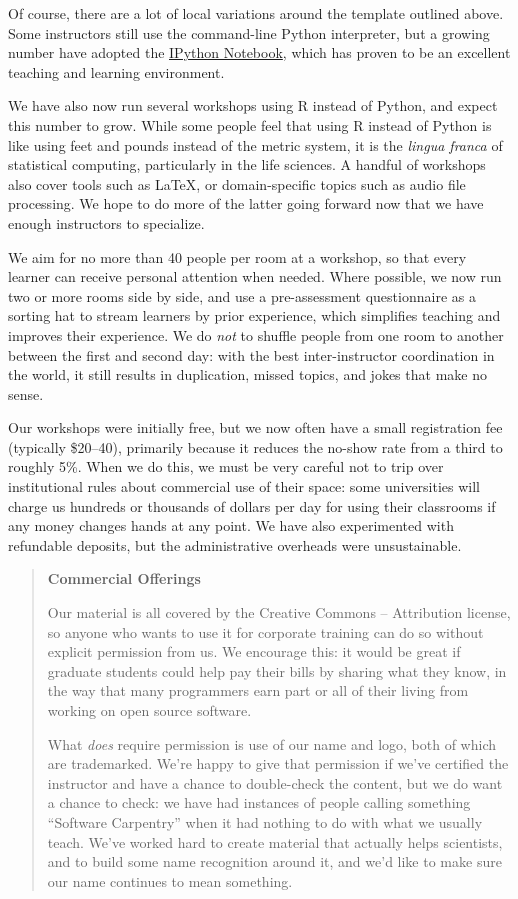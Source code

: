 \documentclass[10pt,a4paper,twocolumn]{article}
\begin{document}
Of course, there are a lot of local variations around the template
outlined above. Some instructors still use the command-line Python
interpreter, but a growing number have adopted the
\href{http://ipython.org/notebook.html}{IPython Notebook}, which has
proven to be an excellent teaching and learning environment.

We have also now run several workshops using R instead of Python, and
expect this number to grow. While some people feel that using R instead
of Python is like using feet and pounds instead of the metric system, it
is the \emph{lingua franca} of statistical computing, particularly in
the life sciences. A handful of workshops also cover tools such as
LaTeX, or domain-specific topics such as audio file processing. We hope
to do more of the latter going forward now that we have enough
instructors to specialize.

We aim for no more than 40 people per room at a workshop, so that
every learner can receive personal attention when needed.  Where
possible, we now run two or more rooms side by side, and use a
pre-assessment questionnaire as a sorting hat to stream learners by
prior experience, which simplifies teaching and improves their
experience.  We do \emph{not} to shuffle people from one room to
another between the first and second day: with the best
inter-instructor coordination in the world, it still results in
duplication, missed topics, and jokes that make no sense.

Our workshops were initially free, but we now often have a small
registration fee (typically \$20--40), primarily because it reduces
the no-show rate from a third to roughly 5\%.  When we do this, we
must be very careful not to trip over institutional rules about
commercial use of their space: some universities will charge us
hundreds or thousands of dollars per day for using their classrooms if
any money changes hands at any point.  We have also experimented with
refundable deposits, but the administrative overheads were
unsustainable.

\begin{quote}
\textbf{Commercial Offerings}

Our material is all covered by the Creative Commons -- Attribution
license, so anyone who wants to use it for corporate training can do
so without explicit permission from us. We encourage this: it would be
great if graduate students could help pay their bills by sharing what
they know, in the way that many programmers earn part or all of their
living from working on open source software.

What \emph{does} require permission is use of our name and logo, both
of which are trademarked. We're happy to give that permission if we've
certified the instructor and have a chance to double-check the
content, but we do want a chance to check: we have had instances of
people calling something ``Software Carpentry'' when it had nothing to
do with what we usually teach. We've worked hard to create material
that actually helps scientists, and to build some name recognition
around it, and we'd like to make sure our name continues to mean
something.
\end{quote}
\end{document}
